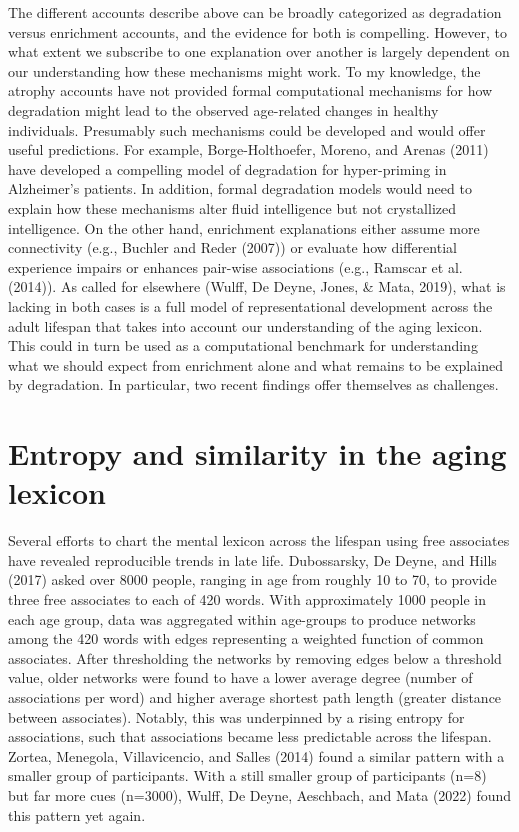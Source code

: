 \documentclass[
  man]{apa6}
\begin{document}
The different accounts describe above can be broadly categorized as degradation versus enrichment accounts, and the evidence for both is compelling. However, to what extent we subscribe to one explanation over another is largely dependent on our understanding how these mechanisms might work. To my knowledge, the atrophy accounts have not provided formal computational mechanisms for how degradation might lead to the observed age-related changes in healthy individuals. Presumably such mechanisms could be developed and would offer useful predictions. For example, Borge-Holthoefer, Moreno, and Arenas (2011) have developed a compelling model of degradation for hyper-priming in Alzheimer's patients. In addition, formal degradation models would need to explain how these mechanisms alter fluid intelligence but not crystallized intelligence. On the other hand, enrichment explanations either assume more connectivity (e.g., Buchler and Reder (2007)) or evaluate how differential experience impairs or enhances pair-wise associations (e.g., Ramscar et al. (2014)). As called for elsewhere (Wulff, De Deyne, Jones, \& Mata, 2019), what is lacking in both cases is a full model of representational development across the adult lifespan that takes into account our understanding of the aging lexicon. This could in turn be used as a computational benchmark for understanding what we should expect from enrichment alone and what remains to be explained by degradation. In particular, two recent findings offer themselves as challenges.

\hypertarget{entropy-and-similarity-in-the-aging-lexicon}{%
\section{Entropy and similarity in the aging lexicon}\label{entropy-and-similarity-in-the-aging-lexicon}}

Several efforts to chart the mental lexicon across the lifespan using free associates have revealed reproducible trends in late life. Dubossarsky, De Deyne, and Hills (2017) asked over 8000 people, ranging in age from roughly 10 to 70, to provide three free associates to each of 420 words. With approximately 1000 people in each age group, data was aggregated within age-groups to produce networks among the 420 words with edges representing a weighted function of common associates. After thresholding the networks by removing edges below a threshold value, older networks were found to have a lower average degree (number of associations per word) and higher average shortest path length (greater distance between associates). Notably, this was underpinned by a rising entropy for associations, such that associations became less predictable across the lifespan. Zortea, Menegola, Villavicencio, and Salles (2014) found a similar pattern with a smaller group of participants. With a still smaller group of participants (n=8) but far more cues (n=3000), Wulff, De Deyne, Aeschbach, and Mata (2022) found this pattern yet again.
\end{document}
